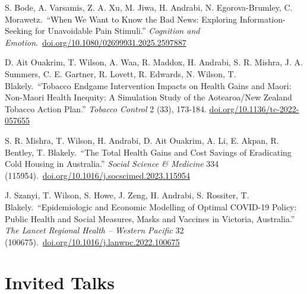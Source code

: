 \documentclass[11pt,letterpaper]{report}
\begin{document}
    \begin{tablist}
        \item[2025] \tab{}S. Bode, A. Varsamis, Z. A. Xu, M. Jiwa, H. Andrabi, N. Egorova-Brumley, C. Morawetz.\ \enquote{When We Want to Know the Bad News: Exploring Information-Seeking for Unavoidable Pain Stimuli.} \textit{Cognition and Emotion}.\ \href{https://doi.org/10.1080/02699931.2025.2597887}{doi.org/10.1080/02699931.2025.2597887}
        \item[2024] \tab{}D. Ait Ouakrim, T. Wilson, A. Waa, R. Maddox, H. Andrabi, S. R. Mishra, J. A. Summers, C. E. Gartner, R. Lovett, R. Edwards, N. Wilson, T. Blakely.\ \enquote{Tobacco Endgame Intervention Impacts on Health Gains and Maori: Non-Maori Health Inequity: A Simulation Study of the Aotearoa/New Zealand Tobacco Action Plan.} \textit{Tobacco Control} 2 (33), 173-184. \href{https://doi.org/10.1136/tc-2022-057655}{doi.org/10.1136/tc-2022-057655}
        \item[2023] \tab{}S. R. Mishra, T. Wilson, H. Andrabi, D. Ait Ouakrim, A. Li, E. Akpan, R. Bentley, T. Blakely.\ \enquote{The Total Health Gains and Cost Savings of Eradicating Cold Housing in Australia.} \textit{Social Science \& Medicine} 334 (115954).\ \href{https://doi.org/10.1016/j.socscimed.2023.115954}{doi.org/10.1016/j.socscimed.2023.115954}
        \item[2023] \tab{}J. Szanyi, T. Wilson, S. Howe, J. Zeng, H. Andrabi, S. Rossiter, T. Blakely.\ \enquote{Epidemiologic and Economic Modelling of Optimal COVID-19 Policy: Public Health and Social Measures, Masks and Vaccines in Victoria, Australia.} \textit{The Lancet Regional Health -- Western Pacific} 32 (100675).\ \href{https://doi.org/10.1016/j.lanwpc.2022.100675}{doi.org/10.1016/j.lanwpc.2022.100675}
    \end{tablist}

    \section*{Invited Talks}
\end{document}

